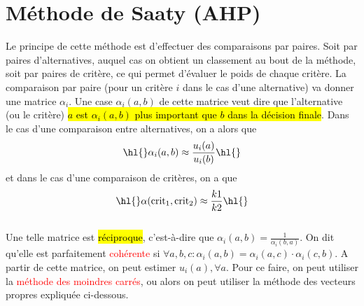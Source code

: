 \documentclass[a4paper, 12pt]{article}
\newcommand{\alinea}{
\hspace*{0.5cm}}
\newcommand{\red}[1]{
	\textcolor{red}{#1}}
\begin{document}
\section{Méthode de Saaty (AHP)}
	\alinea Le principe de cette méthode est d'effectuer des comparaisons par paires. Soit par paires d'alternatives, auquel cas
		on obtient un classement au bout de la méthode, soit par paires de critère, ce qui permet d'évaluer le poids de chaque 
		critère. La comparaison par paire (pour un critère $i$ dans le cas d'une alternative) va donner une matrice $\alpha_i$. 
		Une case $\alpha_i (a, b)$ de cette matrice veut dire que l'alternative (ou le critère) \hl{$a$ est $\alpha_i (a, b)$ 
		plus important que $b$ dans la décision finale}. Dans le cas d'une comparaison entre alternatives, on a alors que
		$$\hl{ }\alpha_i (a, b) \approx \frac{u_i(a)}{u_i(b)}\hl{ }$$ et dans le cas d'une comparaison de critères, on a que
		$$\hl{ }\alpha (\text{crit}_1, \text{crit}_2) \approx \frac{k1}{k2} \hl{ }$$
	~\\
	\alinea Une telle matrice est \hl{réciproque}, c'est-à-dire que $ \alpha_i (a, b) = \frac{1}{\alpha_i (b, a)} $. On dit qu'elle
		est parfaitement \red{cohérente} si $\forall a,b,c : \alpha_i (a, b) = \alpha_i (a, c) \cdot \alpha_i (c, b)$.
		A partir de cette matrice, on peut estimer $u_i(a), \forall a$. Pour ce faire, on peut utiliser la \red{méthode des moindres
		carrés}, ou alors on peut utiliser la méthode des vecteurs propres expliquée ci-dessous.
\end{document}
